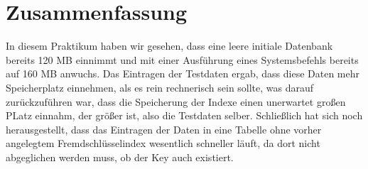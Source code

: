 \chapter{Zusammenfassung}
In diesem Praktikum haben wir gesehen, dass eine leere initiale Datenbank bereits 120 MB einnimmt und mit einer Ausführung eines Systemsbefehls bereits auf 160 MB anwuchs. Das Eintragen der Testdaten ergab, dass diese Daten mehr Speicherplatz einnehmen, als es rein rechnerisch sein sollte, was darauf zurückzuführen war, dass die Speicherung der Indexe einen unerwartet großen PLatz einnahm, der größer ist, also die Testdaten selber. Schließlich hat sich noch herausgestellt, dass das Eintragen der Daten in eine Tabelle ohne vorher angelegtem Fremdschlüsselindex wesentlich schneller läuft, da dort nicht abgeglichen werden muss, ob der Key auch existiert.